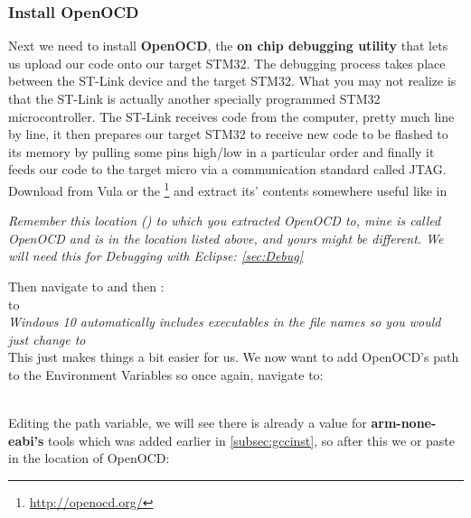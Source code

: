 \subsubsection{Install OpenOCD}
\label{Inst:OpenOCD}
Next we need to install \textbf{\color{Brown} OpenOCD}, the \textbf{on chip debugging utility} that lets us upload our code onto our target STM32. The debugging process takes place between the ST-Link device and the target STM32. What you may not realize is that the ST-Link is actually another specially programmed STM32 microcontroller. The  ST-Link receives code from the computer, pretty much line by line, it then prepares our target STM32 to receive new code to be flashed to its memory by pulling some pins high/low in a particular order and finally it feeds our code to the target micro via a communication standard called JTAG.
\\
Download \href{https://vula.uct.ac.za/x/sRNwF6}{\color{Blue}\underline{}} from Vula or the \href{http://openocd.org/}{\color{Blue}\underline{}}\hspace{1pt}\footnote{\url{http://openocd.org/}} and extract its' contents somewhere useful like in 
\parindent=0pt
\par
\emph{\color{Gray} Remember this location () to which you extracted OpenOCD to, mine is called OpenOCD and is in the location listed above, and yours might be different. We will need this for Debugging with Eclipse: \ref{sec:Debug}}
\par
Then navigate to  and then :
\\
 to 
\\
\emph{\color{Gray} Windows 10 automatically includes executables in the file names so you would just change  to }
\\
This just makes things a bit easier for us. We now want to add OpenOCD's path to the Environment Variables so once again, navigate to:\\
\-\ \hspace{20pt} 
\par
Editing the path variable, we will see there is already a value for \textbf{arm-none-eabi's} tools which was added earlier in \ref{subsec:gccinst}, so after this we \underline{} or paste in the location of OpenOCD:

